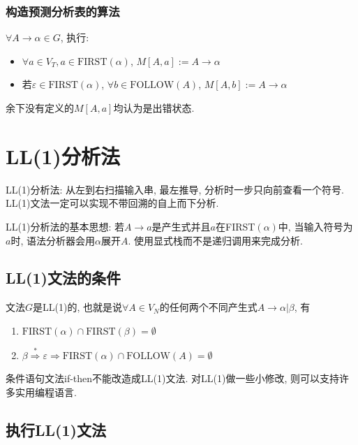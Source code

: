             \subsubsection{构造预测分析表的算法}

                $\forall A\to \alpha\in G$, 执行:
                    \begin{itemize}
                        \item $\forall a\in V_T, a\in\mathrm{FIRST}(\alpha)$, $M[A,a]:=A\to \alpha$
                        \item 若$\varepsilon\in\mathrm{FIRST}(\alpha)$, $\forall b\in\mathrm{FOLLOW}(A)$, $M[A,b]:=A\to \alpha$
                    \end{itemize}

                余下没有定义的$M[A,a]$均认为是出错状态.

    \section{LL(1)分析法}

        \textsf{LL(1)分析法}: 从左到右扫描输入串, 最左推导, 分析时一步只向前查看一个符号. LL(1)文法一定可以实现不带回溯的自上而下分析.

        LL(1)分析法的基本思想: 若$A\to a$是产生式并且$a$在FIRST$(\alpha)$中, 当输入符号为$a$时, 语法分析器会用$\alpha$展开$A$. 使用显式栈而不是递归调用来完成分析. 

        \subsection{LL(1)文法的条件}

            文法$G$是LL(1)的, 也就是说$\forall A\in V_N$的任何两个不同产生式$A\to \alpha|\beta$, 有
            \begin{enumerate}
                \item $\textrm{FIRST}(\alpha)\cap\textrm{FIRST}(\beta)=\emptyset$
                \item $\beta\stackrel{*}{\Rightarrow}\varepsilon\Rightarrow\textrm{FIRST}(\alpha)\cap\textrm{FOLLOW}(A)=\emptyset$
            \end{enumerate}

            条件语句文法if-then不能改造成LL(1)文法. 对LL(1)做一些小修改, 则可以支持许多实用编程语言.

        \subsection{执行LL(1)文法}

